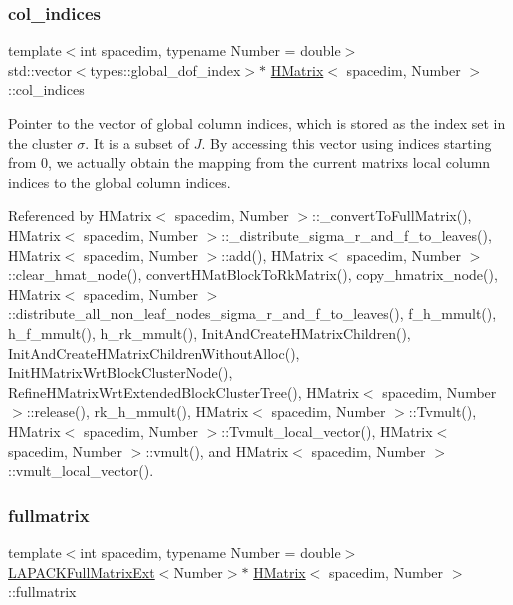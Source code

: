 \subsubsection{\texorpdfstring{col\+\_\+indices}{col\_indices}}
{\footnotesize\ttfamily template$<$int spacedim, typename Number = double$>$ \\
std\+::vector$<$types\+::global\+\_\+dof\+\_\+index$>$$\ast$ \hyperlink{classHMatrix}{H\+Matrix}$<$ spacedim, Number $>$\+::col\+\_\+indices\hspace{0.3cm}{\ttfamily [private]}}

Pointer to the vector of global column indices, which is stored as the index set in the cluster $\sigma$. It is a subset of $J$. By accessing this vector using indices starting from 0, we actually obtain the mapping from the current matrix\textquotesingle{}s local column indices to the global column indices. 

Referenced by H\+Matrix$<$ spacedim, Number $>$\+::\+\_\+convert\+To\+Full\+Matrix(), H\+Matrix$<$ spacedim, Number $>$\+::\+\_\+distribute\+\_\+sigma\+\_\+r\+\_\+and\+\_\+f\+\_\+to\+\_\+leaves(), H\+Matrix$<$ spacedim, Number $>$\+::add(), H\+Matrix$<$ spacedim, Number $>$\+::clear\+\_\+hmat\+\_\+node(), convert\+H\+Mat\+Block\+To\+Rk\+Matrix(), copy\+\_\+hmatrix\+\_\+node(), H\+Matrix$<$ spacedim, Number $>$\+::distribute\+\_\+all\+\_\+non\+\_\+leaf\+\_\+nodes\+\_\+sigma\+\_\+r\+\_\+and\+\_\+f\+\_\+to\+\_\+leaves(), f\+\_\+h\+\_\+mmult(), h\+\_\+f\+\_\+mmult(), h\+\_\+rk\+\_\+mmult(), Init\+And\+Create\+H\+Matrix\+Children(), Init\+And\+Create\+H\+Matrix\+Children\+Without\+Alloc(), Init\+H\+Matrix\+Wrt\+Block\+Cluster\+Node(), Refine\+H\+Matrix\+Wrt\+Extended\+Block\+Cluster\+Tree(), H\+Matrix$<$ spacedim, Number $>$\+::release(), rk\+\_\+h\+\_\+mmult(), H\+Matrix$<$ spacedim, Number $>$\+::\+Tvmult(), H\+Matrix$<$ spacedim, Number $>$\+::\+Tvmult\+\_\+local\+\_\+vector(), H\+Matrix$<$ spacedim, Number $>$\+::vmult(), and H\+Matrix$<$ spacedim, Number $>$\+::vmult\+\_\+local\+\_\+vector().

\mbox{\label{classHMatrix_a328134c9e9cb2c4b05d5431c0ca8a533}} 
\subsubsection{\texorpdfstring{fullmatrix}{fullmatrix}}
{\footnotesize\ttfamily template$<$int spacedim, typename Number = double$>$ \\
\hyperlink{classLAPACKFullMatrixExt}{L\+A\+P\+A\+C\+K\+Full\+Matrix\+Ext}$<$Number$>$$\ast$ \hyperlink{classHMatrix}{H\+Matrix}$<$ spacedim, Number $>$\+::fullmatrix\hspace{0.3cm}{\ttfamily [private]}}

